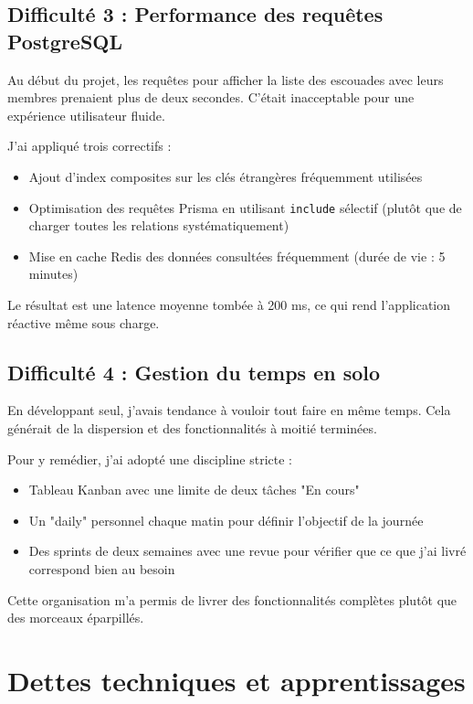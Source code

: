 \subsection*{Difficulté 3 : Performance des requêtes PostgreSQL}

Au début du projet, les requêtes pour afficher la liste des escouades avec leurs membres prenaient plus de deux secondes. C'était inacceptable pour une expérience utilisateur fluide.

J'ai appliqué trois correctifs :
\begin{itemize}
    \item Ajout d'index composites sur les clés étrangères fréquemment utilisées
    \item Optimisation des requêtes Prisma en utilisant \texttt{include} sélectif (plutôt que de charger toutes les relations systématiquement)
    \item Mise en cache Redis des données consultées fréquemment (durée de vie : 5 minutes)
\end{itemize}

Le résultat est une latence moyenne tombée à 200 ms, ce qui rend l'application réactive même sous charge.

\subsection*{Difficulté 4 : Gestion du temps en solo}

En développant seul, j'avais tendance à vouloir tout faire en même temps. Cela générait de la dispersion et des fonctionnalités à moitié terminées.

Pour y remédier, j'ai adopté une discipline stricte :
\begin{itemize}
    \item Tableau Kanban avec une limite de deux tâches "En cours"
    \item Un "daily" personnel chaque matin pour définir l'objectif de la journée
    \item Des sprints de deux semaines avec une revue pour vérifier que ce que j'ai livré correspond bien au besoin
\end{itemize}

Cette organisation m'a permis de livrer des fonctionnalités complètes plutôt que des morceaux éparpillés.

\section{Dettes techniques et apprentissages}

